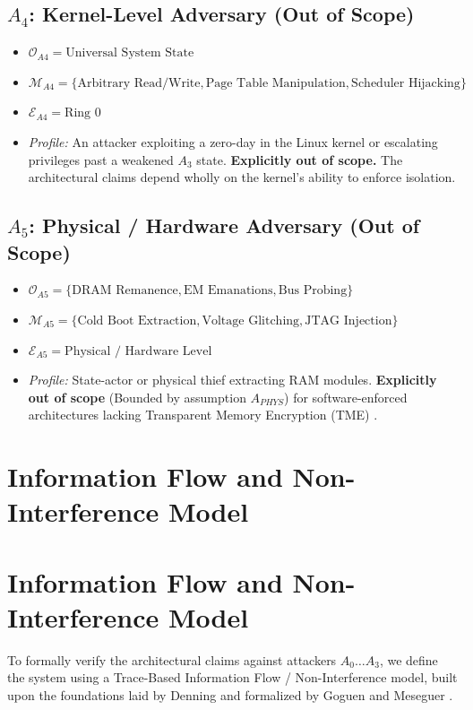 \documentclass[conference]{IEEEtran}
\begin{document}
\subsection{$A_4$: Kernel-Level Adversary (Out of Scope)}
\begin{itemize}
    \item $\mathcal{O}_{A4} = \text{Universal System State}$
    \item $\mathcal{M}_{A4} = \{ \text{Arbitrary Read/Write}, \text{Page Table Manipulation}, \text{Scheduler Hijacking} \}$
    \item $\mathcal{E}_{A4} = \text{Ring 0}$
    \item \textit{Profile:} An attacker exploiting a zero-day in the Linux kernel or escalating privileges past a weakened $A_3$ state. \textbf{Explicitly out of scope.} The architectural claims depend wholly on the kernel's ability to enforce isolation.
\end{itemize}

\subsection{$A_5$: Physical / Hardware Adversary (Out of Scope)}
\begin{itemize}
    \item $\mathcal{O}_{A5} = \{ \text{DRAM Remanence}, \text{EM Emanations}, \text{Bus Probing} \}$
    \item $\mathcal{M}_{A5} = \{ \text{Cold Boot Extraction}, \text{Voltage Glitching}, \text{JTAG Injection} \}$
    \item $\mathcal{E}_{A5} = \text{Physical / Hardware Level}$
    \item \textit{Profile:} State-actor or physical thief extracting RAM modules. \textbf{Explicitly out of scope} (Bounded by assumption $A_{PHYS}$) for software-enforced architectures lacking Transparent Memory Encryption (TME) \cite{b4}.
\end{itemize}

\section{Information Flow and Non-Interference Model}
\section{Information Flow and Non-Interference Model}
To formally verify the architectural claims against attackers $A_0 \dots A_3$, we define the system using a Trace-Based Information Flow / Non-Interference model, built upon the foundations laid by Denning \cite{b12} and formalized by Goguen and Meseguer \cite{b8}.
\end{document}

